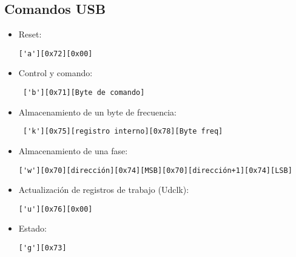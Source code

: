 \subsection{Comandos USB}
\begin{itemize}
\item Reset: \begin{verbatim}['a'][0x72][0x00] \end{verbatim}
\item Control y comando: \begin{verbatim} ['b'][0x71][Byte de comando] \end{verbatim}
\item Almacenamiento de un byte de frecuencia: \begin{verbatim} ['k'][0x75][registro interno][0x78][Byte freq]\end{verbatim}
\item Almacenamiento de una fase: \begin{verbatim}['w'][0x70][dirección][0x74][MSB][0x70][dirección+1][0x74][LSB]\end{verbatim}
\item Actualizaci\'on de registros de trabajo (Udclk): \begin{verbatim}['u'][0x76][0x00] \end{verbatim}
\item Estado: \begin{verbatim}['g'][0x73] \end{verbatim}
\end{itemize}
\newpage